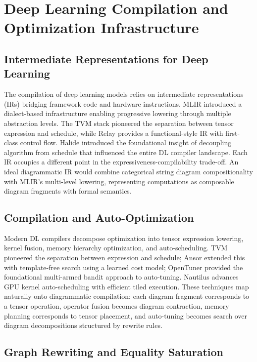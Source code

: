 \documentclass[12pt,a4paper]{article}
\begin{document}
\section{Deep Learning Compilation and Optimization Infrastructure}
\subsection{Intermediate Representations for Deep Learning}

The compilation of deep learning models relies on intermediate representations (IRs) bridging framework code and hardware instructions. MLIR \cite{lai2023relax} introduced a dialect-based infrastructure enabling progressive lowering through multiple abstraction levels. The TVM stack \cite{chen2018tvma} pioneered the separation between tensor expression and schedule, while Relay \cite{roesch2019relayah} provides a functional-style IR with first-class control flow. Halide \cite{ragankelley2017halide} introduced the foundational insight of decoupling algorithm from schedule that influenced the entire DL compiler landscape. Each IR occupies a different point in the expressiveness-compilability trade-off. An ideal diagrammatic IR would combine categorical string diagram compositionality with MLIR's multi-level lowering, representing computations as composable diagram fragments with formal semantics.

\subsection{Compilation and Auto-Optimization}

Modern DL compilers decompose optimization into tensor expression lowering, kernel fusion, memory hierarchy optimization, and auto-scheduling. TVM \cite{chen2018tvma} pioneered the separation between expression and schedule; Ansor \cite{zheng2020ansor} extended this with template-free search using a learned cost model; OpenTuner \cite{ansel2014opentuner} provided the foundational multi-armed bandit approach to auto-tuning. Nautilus \cite{zhao2026nautilus} advances GPU kernel auto-scheduling with efficient tiled execution. These techniques map naturally onto diagrammatic compilation: each diagram fragment corresponds to a tensor operation, operator fusion becomes diagram contraction, memory planning corresponds to tensor placement, and auto-tuning becomes search over diagram decompositions structured by rewrite rules.

\subsection{Graph Rewriting and Equality Saturation}
\end{document}
